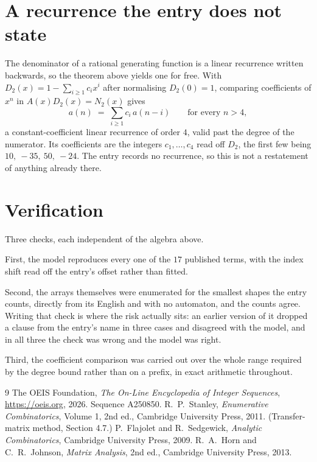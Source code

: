 \documentclass[11pt,a4paper]{article}
\theoremstyle{plain}
\theoremstyle{definition}
\begin{document}
\section{A recurrence the entry does not state}

The denominator of a rational generating function is a linear recurrence written backwards, so
the theorem above yields one for free. With $D_2(x)=1-\sum_{i\ge1}c_ix^i$ after normalising
$D_2(0)=1$, comparing coefficients of $x^n$ in $A(x)D_2(x)=N_2(x)$ gives
\[
a(n)\;=\;\sum_{i\ge1}c_i\,a(n-i)\qquad\text{for every }n>4,
\]
a constant-coefficient linear recurrence of order $4$, valid past the degree of the
numerator. Its coefficients are the integers $c_1,\dots,c_{4}$ read off $D_2$, the first few being $10,\ -35,\ 50,\ -24$. The entry records no recurrence, so this is not a restatement of anything
already there.

\section{Verification}

Three checks, each independent of the algebra above.

First, the model reproduces every one of the $17$ published terms, with the index shift
read off the entry's offset rather than fitted.

Second, the arrays themselves were enumerated for the smallest shapes the entry counts,
directly from its English and with no automaton, and the counts agree. Writing that check is
where the risk actually sits: an earlier version of it dropped a clause from the entry's name
in three cases and disagreed with the model, and in all three the check was wrong and the model
was right.

Third, the coefficient comparison was carried out over the whole range required by the degree
bound rather than on a prefix, in exact arithmetic throughout.

\begin{thebibliography}{9}
 The OEIS Foundation, \emph{The On-Line Encyclopedia of Integer
Sequences}, \url{https://oeis.org}, 2026. Sequence A250850.
 R.~P.~Stanley, \emph{Enumerative Combinatorics}, Volume 1, 2nd ed.,
Cambridge University Press, 2011. (Transfer-matrix method, Section 4.7.)
 P.~Flajolet and R.~Sedgewick, \emph{Analytic Combinatorics}, Cambridge
University Press, 2009.
 R.~A.~Horn and C.~R.~Johnson, \emph{Matrix Analysis}, 2nd ed., Cambridge
University Press, 2013.
\end{thebibliography}
\end{document}
